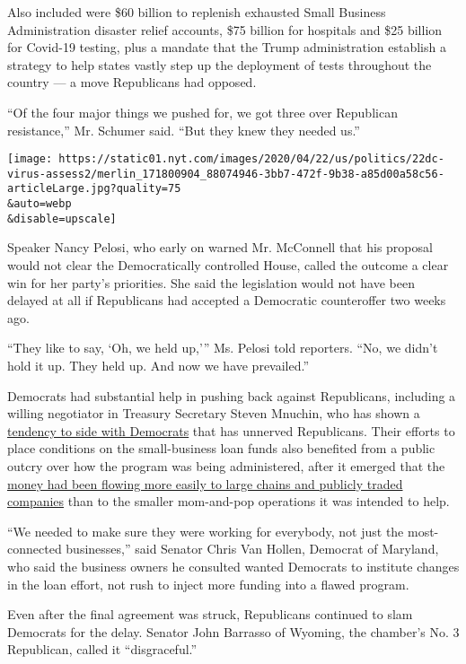 Also included were \$60 billion to replenish exhausted Small Business
Administration disaster relief accounts, \$75 billion for hospitals and
\$25 billion for Covid-19 testing, plus a mandate that the Trump
administration establish a strategy to help states vastly step up the
deployment of tests throughout the country --- a move Republicans had
opposed.

``Of the four major things we pushed for, we got three over Republican
resistance,'' Mr. Schumer said. ``But they knew they needed us.''

\texttt{[image: https://static01.nyt.com/images/2020/04/22/us/politics/22dc-virus-assess2/merlin\_171800904\_88074946-3bb7-472f-9b38-a85d00a58c56-articleLarge.jpg?quality=75\\\&auto=webp\\\&disable=upscale]}

Speaker Nancy Pelosi, who early on warned Mr. McConnell that his
proposal would not clear the Democratically controlled House, called the
outcome a clear win for her party's priorities. She said the legislation
would not have been delayed at all if Republicans had accepted a
Democratic counteroffer two weeks ago.

``They like to say, `Oh, we held up,''' Ms. Pelosi told reporters. ``No,
we didn't hold it up. They held up. And now we have prevailed.''

Democrats had substantial help in pushing back against Republicans,
including a willing negotiator in Treasury Secretary Steven Mnuchin, who
has shown a
\href{https://www.nytimes.com/2020/04/17/us/politics/coronavirus-mnuchin-republicans.html}{tendency
to side with Democrats} that has unnerved Republicans. Their efforts to
place conditions on the small-business loan funds also benefited from a
public outcry over how the program was being administered, after it
emerged that the
\href{https://www.nytimes.com/2020/04/20/business/shake-shack-returning-loan-ppp-coronavirus.html}{money
had been flowing more easily to large chains and publicly traded
companies} than to the smaller mom-and-pop operations it was intended to
help.

``We needed to make sure they were working for everybody, not just the
most-connected businesses,'' said Senator Chris Van Hollen, Democrat of
Maryland, who said the business owners he consulted wanted Democrats to
institute changes in the loan effort, not rush to inject more funding
into a flawed program.

Even after the final agreement was struck, Republicans continued to slam
Democrats for the delay. Senator John Barrasso of Wyoming, the chamber's
No. 3 Republican, called it ``disgraceful.''

